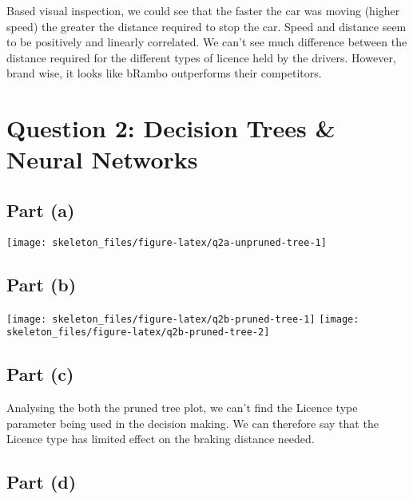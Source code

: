 \documentclass[12pt,halfline,a4paper,]{ouparticle}
\begin{document}
Based visual inspection, we could see that the faster the car was moving
(higher speed) the greater the distance required to stop the car. Speed
and distance seem to be positively and linearly correlated. We can't see
much difference between the distance required for the different types of
licence held by the drivers. However, brand wise, it looks like bRambo
outperforms their competitors.

\section{Question 2: Decision Trees \& Neural
Networks}\label{question-2-decision-trees-neural-networks}

\subsection{Part (a)}\label{part-a-1}

\texttt{[image: skeleton\_files/figure-latex/q2a-unpruned-tree-1]}

\subsection{Part (b)}\label{part-b-1}

\texttt{[image: skeleton\_files/figure-latex/q2b-pruned-tree-1]}
\texttt{[image: skeleton\_files/figure-latex/q2b-pruned-tree-2]}

\subsection{Part (c)}\label{part-c}

Analysing the both the pruned tree plot, we can't find the Licence type
parameter being used in the decision making. We can therefore say that
the Licence type has limited effect on the braking distance needed.

\subsection{Part (d)}\label{part-d}
\end{document}
